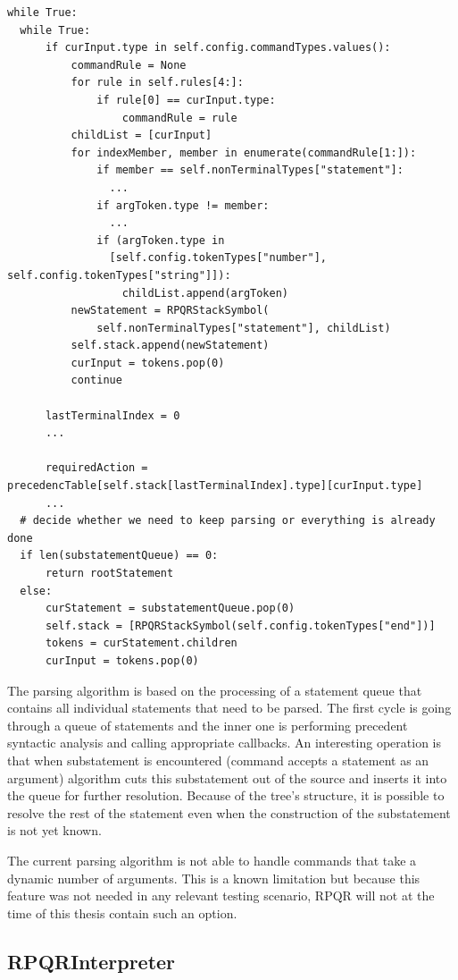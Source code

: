 \begin{lstlisting}
while True:
  while True:
      if curInput.type in self.config.commandTypes.values():
          commandRule = None
          for rule in self.rules[4:]:
              if rule[0] == curInput.type:
                  commandRule = rule
          childList = [curInput]
          for indexMember, member in enumerate(commandRule[1:]):
              if member == self.nonTerminalTypes["statement"]:
                ...
              if argToken.type != member:
                ...
              if (argToken.type in
                [self.config.tokenTypes["number"], self.config.tokenTypes["string"]]):
                  childList.append(argToken)
          newStatement = RPQRStackSymbol(
              self.nonTerminalTypes["statement"], childList)
          self.stack.append(newStatement)
          curInput = tokens.pop(0)
          continue

      lastTerminalIndex = 0
      ...

      requiredAction = precedencTable[self.stack[lastTerminalIndex].type][curInput.type]
      ...
  # decide whether we need to keep parsing or everything is already done
  if len(substatementQueue) == 0:
      return rootStatement
  else:
      curStatement = substatementQueue.pop(0)
      self.stack = [RPQRStackSymbol(self.config.tokenTypes["end"])]
      tokens = curStatement.children
      curInput = tokens.pop(0)
\end{lstlisting}

The parsing algorithm is based on the processing of a statement queue that contains all individual statements
that need to be parsed. The first cycle is going through a queue of statements and the inner one is
performing precedent syntactic analysis and calling appropriate callbacks. An interesting operation is
that when substatement is encountered (command accepts a statement as an argument) algorithm cuts this
substatement out of the source and inserts it into the queue for further resolution. Because of the tree's structure, it is possible to resolve the rest of the statement even when the construction of the substatement is not yet
known.

The current parsing algorithm is not able to handle commands that take a dynamic number of arguments. This
is a known limitation but because this feature was not needed in any relevant testing scenario,
RPQR will not at the time of this thesis contain such an option.

\newpage

\subsection*{RPQRInterpreter}

